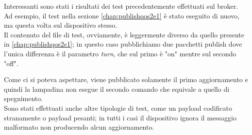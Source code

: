 \documentclass[binding=0.6cm,TFA]{sapthesis}
\begin{document}
\begin{large}
Interessanti sono stati i risultati dei test precedentemente effettuati sul broker. Ad esempio, il test nella sezione \ref{chap:publishqos2e1} è stato eseguito di nuovo, ma questa volta sul dispositivo stesso. \\
Il contenuto del file di test, ovviamente, è leggermente diverso da quello presente in \ref{chap:publishqos2e1}; in questo caso pubblichiamo due pacchetti publish dove l'unica differenza è il parametro \textit{turn}, che sul primo è "on" mentre sul secondo "off". \\

\newpage
\begin{python}
\end{python}
Come ci si poteva aspettare, viene pubblicato solamente il primo aggiornamento e quindi la lampadina non esegue il secondo comando che equivale a quello di spegnimento. \\

Sono stati effettuati anche altre tipologie di test, come un payload codificato stranamente o payload pesanti; in tutti i casi il dispositivo ignora il messaggio malformato non producendo alcun aggiornamento. \\


\end{large}
\end{document}
